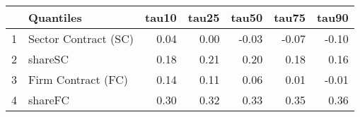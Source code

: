 \begin{table}[ht]
\centering
\begin{tabular}{rlrrrrr}
  \hline
 & Quantiles & tau10 & tau25 & tau50 & tau75 & tau90 \\ 
  \hline
1 & Sector Contract (SC) & 0.04 & 0.00 & -0.03 & -0.07 & -0.10 \\ 
  2 & shareSC & 0.18 & 0.21 & 0.20 & 0.18 & 0.16 \\ 
  3 & Firm Contract (FC) & 0.14 & 0.11 & 0.06 & 0.01 & -0.01 \\ 
  4 & shareFC & 0.30 & 0.32 & 0.33 & 0.35 & 0.36 \\ 
   \hline
\end{tabular}
\end{table}
